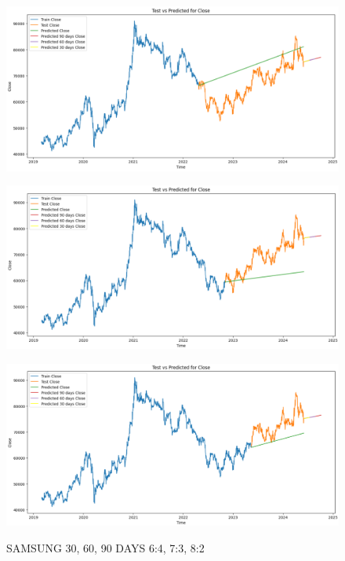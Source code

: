 \documentclass[conference]{IEEEtran}
\begin{document}
\begin{figure}[H]
    \centering
    \begin{minipage}{0.15\textwidth}
    \centering
    \includegraphics[width=1\textwidth]{Image/VARMA/SAMSUNG/6_4.png}
   
    \label{fig:1}
    \end{minipage}%
    \begin{minipage}{0.15\textwidth}
    \centering
    \includegraphics[width=1\textwidth]{Image/VARMA/SAMSUNG/7_3.png}
  
    \label{fig:2}
    \end{minipage}%
    \begin{minipage}{0.15\textwidth}
    \centering
    \includegraphics[width=1\textwidth]{Image/VARMA/SAMSUNG/8_2.png}

    \label{fig:3}
    \end{minipage}
    \caption{ SAMSUNG 30, 60, 90 DAYS  6:4, 7:3, 8:2 }
\end{figure}
\end{document}
